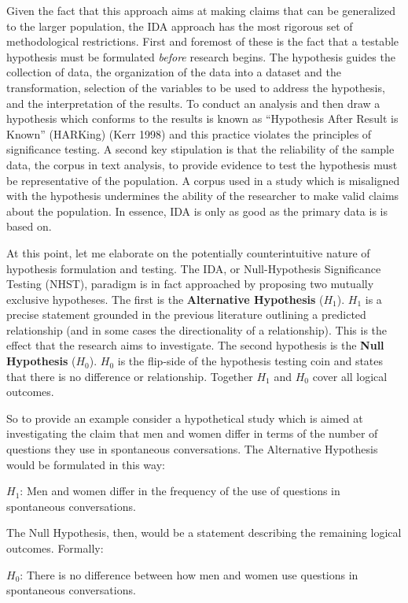 \documentclass[
  letterpaper,
]{latex/krantz}
\begin{document}
Given the fact that this approach aims at making claims that can be
generalized to the larger population, the IDA approach has the most
rigorous set of methodological restrictions. First and foremost of these
is the fact that a testable hypothesis must be formulated \emph{before}
research begins. The hypothesis guides the collection of data, the
organization of the data into a dataset and the transformation,
selection of the variables to be used to address the hypothesis, and the
interpretation of the results. To conduct an analysis and then draw a
hypothesis which conforms to the results is known as ``Hypothesis After
Result is Known'' (HARKing) (Kerr 1998) and this practice violates the
principles of significance testing. A second key stipulation is that the
reliability of the sample data, the corpus in text analysis, to provide
evidence to test the hypothesis must be representative of the
population. A corpus used in a study which is misaligned with the
hypothesis undermines the ability of the researcher to make valid claims
about the population. In essence, IDA is only as good as the primary
data is is based on.

At this point, let me elaborate on the potentially counterintuitive
nature of hypothesis formulation and testing. The IDA, or
Null-Hypothesis Significance Testing (NHST), paradigm is in fact
approached by proposing two mutually exclusive hypotheses. The first is
the \textbf{Alternative Hypothesis} (\(H_1\)). \(H_1\) is a precise
statement grounded in the previous literature outlining a predicted
relationship (and in some cases the directionality of a relationship).
This is the effect that the research aims to investigate. The second
hypothesis is the \textbf{Null Hypothesis} (\(H_0\)). \(H_0\) is the
flip-side of the hypothesis testing coin and states that there is no
difference or relationship. Together \(H_1\) and \(H_0\) cover all
logical outcomes.

So to provide an example consider a hypothetical study which is aimed at
investigating the claim that men and women differ in terms of the number
of questions they use in spontaneous conversations. The Alternative
Hypothesis would be formulated in this way:

\(H_1\): Men and women differ in the frequency of the use of questions
in spontaneous conversations.

The Null Hypothesis, then, would be a statement describing the remaining
logical outcomes. Formally:

\(H_0\): There is no difference between how men and women use questions
in spontaneous conversations.
\end{document}
